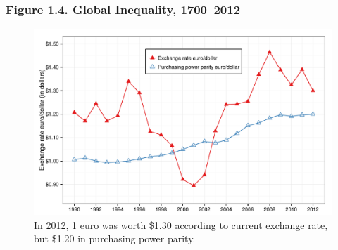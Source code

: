 \documentclass[t]{beamer}\usepackage[]{graphicx}\usepackage[]{color}
\newenvironment{knitrout}{}{} %
\begin{document}
\begin{frame}[label=Figure_1_4,fragile]
\frametitle{Figure 1.4. Global Inequality, 1700--2012}
\begin{figure}[t]
\begin{minipage}[b]{\textwidth}
\centering
\begin{knitrout}\footnotesize
{}\color{fgcolor}

{\centering \includegraphics[width=1\linewidth]{figures/color/Figure_1_4} 

}



\end{knitrout}
\caption{In 2012, 1 euro was worth \$1.30 according to current exchange rate, but \$1.20 in purchasing power parity.}
\end{minipage}
\end{figure}
\end{frame}
\end{document}
